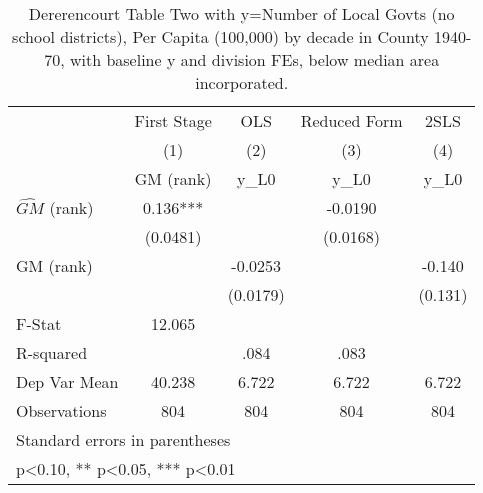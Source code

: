 \begin{table}[htbp]\centering
\def\sym#1{\ifmmode^{#1}\else\(^{#1}\)\fi}
\caption{Dererencourt Table Two with y=Number of Local Govts (no school districts), Per Capita (100,000) by decade in County 1940-70, with baseline y and division FEs, below median area incorporated.}
\begin{tabular}{l*{4}{c}}
\toprule
                    & First Stage   &         OLS   &Reduced Form   &        2SLS   \\
                    &\multicolumn{1}{c}{(1)}&\multicolumn{1}{c}{(2)}&\multicolumn{1}{c}{(3)}&\multicolumn{1}{c}{(4)}\\
                    &\multicolumn{1}{c}{GM  (rank)}&\multicolumn{1}{c}{y\_L0}&\multicolumn{1}{c}{y\_L0}&\multicolumn{1}{c}{y\_L0}\\
\midrule
$\hat{GM}$ (rank)   &       0.136***&               &     -0.0190   &               \\
                    &    (0.0481)   &               &    (0.0168)   &               \\
\addlinespace
GM  (rank)          &               &     -0.0253   &               &      -0.140   \\
                    &               &    (0.0179)   &               &     (0.131)   \\
\midrule
F-Stat              &      12.065   &               &               &               \\
R-squared           &               &        .084   &        .083   &               \\
Dep Var Mean        &      40.238   &       6.722   &       6.722   &       6.722   \\
Observations        &         804   &         804   &         804   &         804   \\
\bottomrule
\multicolumn{5}{l}{\footnotesize Standard errors in parentheses}\\
\multicolumn{5}{l}{\footnotesize * p<0.10, ** p<0.05, *** p<0.01}\\
\end{tabular}
\end{table}
